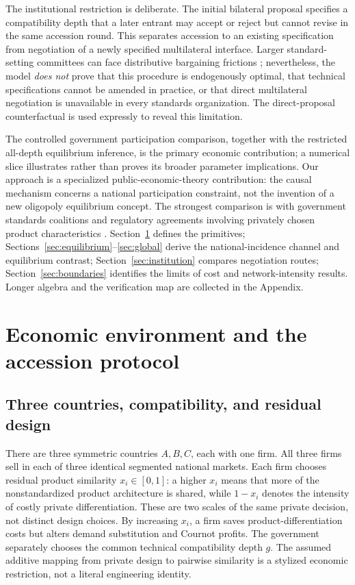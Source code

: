 \documentclass[11pt,a4paper]{article}
\theoremstyle{remark}\newtheorem{remark}[theorem]{Remark}
\begin{document}
The institutional restriction is deliberate. The initial bilateral proposal specifies a compatibility depth that a later entrant may accept or reject but cannot revise in the same accession round. This separates accession to an existing specification from negotiation of a newly specified multilateral interface. Larger standard-setting committees can face distributive bargaining frictions \citep{Simcoe2012}; nevertheless, the model \emph{does not} prove that this procedure is endogenously optimal, that technical specifications cannot be amended in practice, or that direct multilateral negotiation is unavailable in every standards organization. The direct-proposal counterfactual is used expressly to reveal this limitation.

The controlled government participation comparison, together with the restricted all-depth equilibrium inference, is the primary economic contribution; a numerical slice illustrates rather than proves its broader parameter implications. Our approach is a specialized public-economic-theory contribution: the causal mechanism concerns a national participation constraint, not the invention of a new oligopoly equilibrium concept. The strongest comparison is with government standards coalitions \citep{Takarada2020,Kawabata2021} and regulatory agreements involving privately chosen product characteristics \citep{Grossman2021}. Section~\ref{sec:model} defines the primitives; Sections~\ref{sec:equilibrium}--\ref{sec:global} derive the national-incidence channel and equilibrium contrast; Section~\ref{sec:institution} compares negotiation routes; Section~\ref{sec:boundaries} identifies the limits of cost and network-intensity results. Longer algebra and the verification map are collected in the Appendix.

\section{Economic environment and the accession protocol}\label{sec:model}
\subsection{Three countries, compatibility, and residual design}
There are three symmetric countries $A,B,C$, each with one firm. All three firms sell in each of three identical segmented national markets. Each firm chooses residual product similarity $x_i\in[0,1]$: a higher $x_i$ means that more of the nonstandardized product architecture is shared, while $1-x_i$ denotes the intensity of costly private differentiation. These are two scales of the same private decision, not distinct design choices. By increasing $x_i$, a firm saves product-differentiation costs but alters demand substitution and Cournot profits. The government separately chooses the common technical compatibility depth $g$. The assumed additive mapping from private design to pairwise similarity is a stylized economic restriction, not a literal engineering identity.
\end{document}
